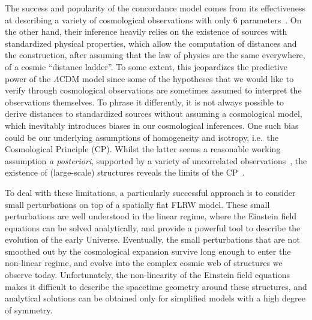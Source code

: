 \documentclass[notitlepage,nofootinbib]{revtex4-1}
\begin{document}
The success and popularity of the concordance model comes from its effectiveness at describing a variety of cosmological observations with only 6 parameters~\cite{DES:2021wwk,eBOSS:2020yzd,Mossa:2020gjc,Brout:2022vxf,Planck:2018vyg}.  
On the other hand, their inference heavily relies on the existence of sources with standardized physical properties, which allow the computation of distances and the construction, after assuming that the law of physics are the same everywhere, of a cosmic ``distance ladder''. To some extent, this jeopardizes the predictive power of the $\Lambda$CDM model since some of the hypotheses that we would like to verify through cosmological observations are sometimes assumed to interpret the observations themselves. To phrase it differently, it is not always possible to derive distances to standardized sources without assuming a cosmological model, which inevitably introduces biases in our cosmological inferences. One such bias could be our underlying assumptions of homogeneity and isotropy, i.e.\ the Cosmological Principle (CP). Whilst the latter seems a reasonable working assumption \textit{a posteriori}, supported by a variety of uncorrelated observations~\cite{Planck:2018vyg,WMAP:2012fli,Scrimgeour:2012wt,Ntelis:2017nrj,Laurent:2016eqo}, the existence of (large-scale) structures reveals the limits of the CP~\cite{Singal:2014wra,Bengaly:2017slg,Migkas:2020fza,Secrest:2020has,Nadolny:2021hti,Secrest:2022uvx,Aluri:2022hzs,Whitford:2023oww}. 

To deal with these limitations, a particularly successful approach is to consider small perturbations on top of a spatially flat FLRW model. These small perturbations are well understood in the linear regime, where the Einstein field equations can be solved analytically, and provide a powerful tool to describe the evolution of the early Universe. Eventually,  the small perturbations that are not smoothed out by the cosmological expansion survive long enough to enter the non-linear regime, and evolve into the complex cosmic web of structures we observe today. Unfortunately, the non-linearity of the Einstein field equations makes it difficult to describe the spacetime geometry around these structures, and analytical solutions can be obtained only for simplified models with a high degree of symmetry.
\end{document}
